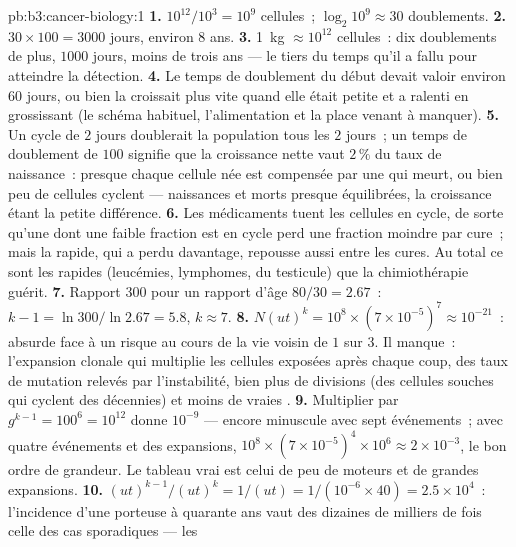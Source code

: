\begin{solution}{pb:b3:cancer-biology:1}
\textbf{1.} $10^{12}/10^{3} = 10^{9}$ cellules~; $\log_{2}10^{9} \approx 30$
doublements.
\textbf{2.} $30\times 100 = 3000$ jours, environ $8$ ans.
\textbf{3.} \qty{1}{kg} $\approx 10^{12}$ cellules~: dix doublements de
plus, $1000$ jours, moins de trois ans --- le tiers du temps qu'il a
fallu pour atteindre la détection.
\textbf{4.} Le temps de doublement du début devait valoir environ $60$
jours, ou bien la  croissait plus vite quand elle était petite et
a ralenti en grossissant (le schéma habituel, l'alimentation et la place
venant à manquer).
\textbf{5.} Un cycle de $2$ jours doublerait la population tous les $2$
jours~; un temps de doublement de $100$ signifie que la croissance
nette vaut $2\,\%$ du taux de naissance~: presque chaque cellule née est
compensée par une qui meurt, ou bien peu de cellules cyclent ---
naissances et morts presque équilibrées, la croissance étant la petite
différence.
\textbf{6.} Les médicaments tuent les cellules en cycle, de sorte
qu'une  dont une faible fraction est en cycle perd une fraction
moindre par cure~; mais la  rapide, qui a perdu davantage,
repousse aussi entre les cures. Au total ce sont les  rapides
(leucémies, lymphomes,  du testicule) que la chimiothérapie
guérit.
\textbf{7.} Rapport $300$ pour un rapport d'âge $80/30 = 2.67$~: $k - 1 =
\ln 300/\ln 2.67 = 5.8$, $k \approx 7$.
\textbf{8.} $N(ut)^{k} = 10^{8}\times (7\times 10^{-5})^{7} \approx
10^{-21}$~: absurde face à un risque au cours de la vie voisin de $1$
sur $3$. Il manque~: l'expansion clonale qui multiplie les cellules
exposées après chaque coup, des taux de mutation relevés par
l'instabilité, bien plus de divisions (des cellules souches qui cyclent
des décennies) et moins de vraies .
\textbf{9.} Multiplier par $g^{k-1} = 100^{6} = 10^{12}$ donne $10^{-9}$
--- encore minuscule avec sept événements~; avec quatre événements et
des expansions, $10^{8}\times (7\times 10^{-5})^{4}\times 10^{6} \approx 2\times
10^{-3}$, le bon ordre de grandeur. Le tableau vrai est celui de peu de
moteurs et de grandes expansions.
\textbf{10.} $(ut)^{k-1}/(ut)^{k} = 1/(ut) = 1/(10^{-6}\times 40) =
2.5\times 10^{4}$~: l'incidence d'une porteuse à quarante ans vaut des
dizaines de milliers de fois celle des cas sporadiques --- les 

\end{solution}
